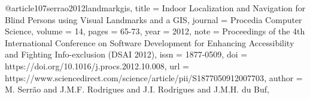 @article{107serrao2012landmarkgis,
title = {Indoor Localization and Navigation for Blind Persons using Visual Landmarks and a GIS},
journal = {Procedia Computer Science},
volume = {14},
pages = {65-73},
year = {2012},
note = {Proceedings of the 4th International Conference on Software Development for Enhancing Accessibility and Fighting Info-exclusion (DSAI 2012)},
issn = {1877-0509},
doi = {https://doi.org/10.1016/j.procs.2012.10.008},
url = {https://www.sciencedirect.com/science/article/pii/S1877050912007703},
author = {M. Serrão and J.M.F. Rodrigues and J.I. Rodrigues and J.M.H. {du Buf}},
}